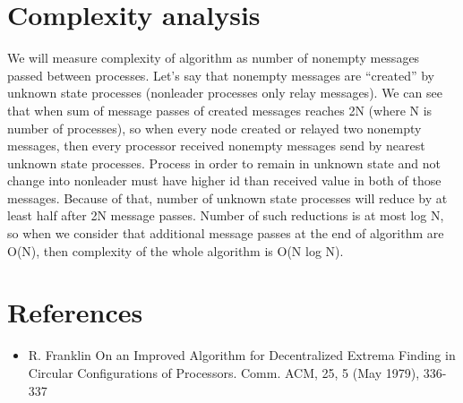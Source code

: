 \documentclass{article}
\begin{document}
\section*{Complexity analysis}
We will measure complexity of algorithm as number of nonempty messages passed between processes. \newline
Let’s say that nonempty messages are “created” by unknown state processes (nonleader processes only relay messages). We can see that when sum of message passes of created messages reaches 2N (where N is number of processes), so when every node created or relayed two nonempty messages, then every processor received nonempty messages send by nearest unknown state processes. Process in order to remain in unknown state and not change into nonleader must have higher id than received value in both of those messages. Because of that, number of unknown state processes will reduce by at least half after 2N message passes. Number of such reductions is at most log N, so when we consider that additional message passes at the end of algorithm are O(N), then complexity of the whole algorithm is O(N log N).

\section*{References}
\begin{itemize}
    \item R. Franklin On an Improved Algorithm for Decentralized Extrema Finding in Circular Configurations of Processors. Comm. ACM, 25, 5 (May 1979), 336-337
\end{itemize}
\end{document}
